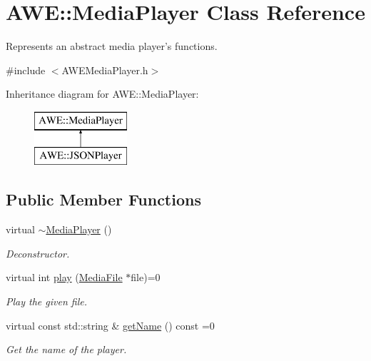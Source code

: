 \hypertarget{class_a_w_e_1_1_media_player}{\section{A\-W\-E\-:\-:Media\-Player Class Reference}
\label{class_a_w_e_1_1_media_player}
}


Represents an abstract media player's functions.  




{\ttfamily \#include $<$A\-W\-E\-Media\-Player.\-h$>$}

Inheritance diagram for A\-W\-E\-:\-:Media\-Player\-:\begin{figure}[H]
\begin{center}
\leavevmode
\includegraphics[height=2.000000cm]{class_a_w_e_1_1_media_player}
\end{center}
\end{figure}
\subsection*{Public Member Functions}
\begin{DoxyCompactItemize}
\item 
\hypertarget{class_a_w_e_1_1_media_player_af4e56a79d4ee564e0337a6b5c0bbf592}{virtual \hyperlink{class_a_w_e_1_1_media_player_af4e56a79d4ee564e0337a6b5c0bbf592}{$\sim$\-Media\-Player} ()}\label{class_a_w_e_1_1_media_player_af4e56a79d4ee564e0337a6b5c0bbf592}

\begin{DoxyCompactList}\small\item\em Deconstructor. \end{DoxyCompactList}\item 
virtual int \hyperlink{class_a_w_e_1_1_media_player_a8a7660cdf7306adf61a7c79831ee7171}{play} (\hyperlink{class_a_w_e_1_1_media_file}{Media\-File} $\ast$file)=0
\begin{DoxyCompactList}\small\item\em Play the given file. \end{DoxyCompactList}\item 
virtual const std\-::string \& \hyperlink{class_a_w_e_1_1_media_player_a59d47b0590a9cba607e2189947ea0239}{get\-Name} () const =0
\begin{DoxyCompactList}\small\item\em Get the name of the player. \end{DoxyCompactList}\end{DoxyCompactItemize}


